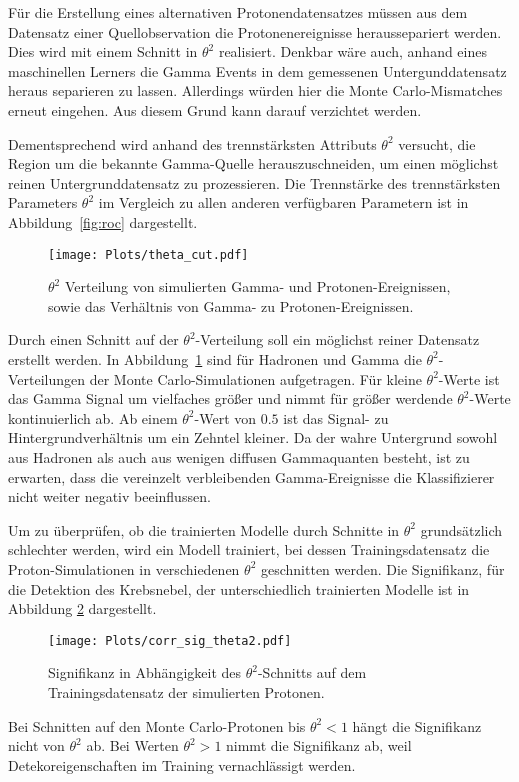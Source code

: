 Für die Erstellung eines alternativen Protonendatensatzes müssen aus dem Datensatz einer Quellobservation die Protonenereignisse heraussepariert werden. 
Dies wird mit einem Schnitt in $\theta^{2}$ realisiert.
Denkbar wäre auch, anhand eines maschinellen Lerners die Gamma Events in dem gemessenen Untergunddatensatz heraus separieren zu lassen.
Allerdings würden hier die Monte Carlo-Mismatches erneut eingehen. 
Aus diesem Grund kann darauf verzichtet werden.

Dementsprechend wird anhand des trennstärksten Attributs $\theta^{2}$ versucht, die Region um die bekannte Gamma-Quelle herauszuschneiden, um einen möglichst reinen Untergrunddatensatz zu prozessieren. 
Die Trennstärke des trennstärksten Parameters $\theta^{2}$ im Vergleich zu allen anderen verfügbaren Parametern ist in Abbildung~\ref{fig:roc} dargestellt. 
\begin{figure}[H]
  \centering
  \texttt{[image: Plots/theta\_cut.pdf]}
  \caption{$\theta^{2}$ Verteilung von simulierten Gamma- und Protonen-Ereignissen, sowie das Verhältnis von Gamma- zu Protonen-Ereignissen.}
  \label{fig:thetacut}
\end{figure}
Durch einen Schnitt auf der $\theta^{2}$-Verteilung soll ein möglichst reiner Datensatz erstellt werden. 
In Abbildung~\ref{fig:thetacut} sind für Hadronen und Gamma die $\theta^{2}$-Verteilungen der Monte Carlo-Simulationen aufgetragen. 
Für kleine $\theta^{2}$-Werte ist das Gamma Signal um vielfaches größer und nimmt für größer werdende $\theta^{2}$-Werte kontinuierlich ab. 
Ab einem $\theta^{2}$-Wert von $0.5$ ist das Signal- zu Hintergrundverhältnis um ein Zehntel kleiner.
Da der wahre Untergrund sowohl aus Hadronen als auch aus wenigen diffusen Gammaquanten besteht, ist zu erwarten, dass die vereinzelt verbleibenden Gamma-Ereignisse die Klassifizierer nicht weiter negativ beeinflussen.

Um zu überprüfen, ob die trainierten Modelle durch Schnitte in $\theta^{2}$ grundsätzlich schlechter werden, wird ein Modell trainiert, bei dessen Trainingsdatensatz die Proton-Simulationen in verschiedenen $\theta^{2}$ geschnitten werden. 
Die Signifikanz, für die Detektion des Krebsnebel, der unterschiedlich trainierten Modelle ist in Abbildung \ref{fig:corrtheta} dargestellt.
\begin{figure}[H]
  \centering
  \texttt{[image: Plots/corr\_sig\_theta2.pdf]}
  \caption{Signifikanz in Abhängigkeit des $\theta^{2}$-Schnitts auf dem Trainingsdatensatz der simulierten Protonen.}
  \label{fig:corrtheta}
\end{figure}
Bei Schnitten auf den Monte Carlo-Protonen bis $\theta^{2} < 1$ hängt die Signifikanz nicht von $\theta^{2}$ ab.
Bei Werten $\theta^{2} > 1$ nimmt die Signifikanz ab, weil Detekoreigenschaften im Training vernachlässigt werden.

